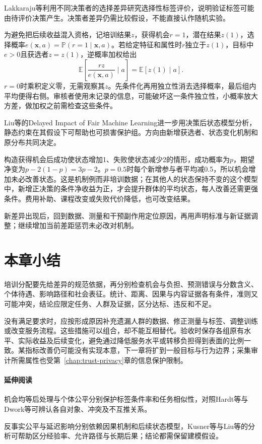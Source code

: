Lakkaraju等利用不同决策者的选择差异研究选择性标签评价，说明验证标签可能由待评价决策产生。决策者差异仍需比较假设，不能直接认作随机实验。

为避免把后续收益混入资格，记培训结果$z$，获得机会$r=1$，潜在结果$z(1)$，选择概率$e(\bm{x},a)=\mathbb P(r=1\mid\bm{x},a)$。若给定特征和属性时$r$独立于$z(1)$，目标中$e>0$且获选者$z=z(1)$，逆概率加权给出
\begin{equation}
 \mathbb E\!\left[\frac{r z}{e(\bm{x},a)}\mid a\right]
 =\mathbb E[z(1)\mid a].
 \label{eq:fairness-selective-weight}
\end{equation}
$r=0$时乘积定义零，无需观察其$z$。先条件化再用独立性消去选择概率，最后组内平均便得右侧。审核者使用未记录的信息，可能破坏这一条件独立性，小概率放大方差，做加权之前需检查这些条件。

Liu等的Delayed Impact of Fair Machine Learning进一步用决策后状态模型分析，静态约束在其假设下可帮助也可损害保护组。方向由新增获选者、状态变化机制和原分布共同决定。

构造获得机会后成功使状态增加1、失败使状态减少2的情形，成功概率为$p$，期望净变为$p-2(1-p)=3p-2$。$p=0.5$时每个新增参与者平均减0.5，所以机会增加未必改善状态。这是机制例而非培训数据；在其他人的状态保持不变的这个模型中，新增正决策的条件净收益为正，才会提升群体的平均状态，每人改善还需更强条件。费用补助、课程改变或失败代价降低，也可改变结果。

新差异出现后，回到数据、测量和干预副作用定位原因，再用声明标准与新证据调整；继续增加当前差距惩罚未必改对机制。

\section{本章小结}
\label{sec:fairness-summary}

培训分配要先给差异的规范依据，再分别检查机会与负担、预测错误与分数含义、个体待遇、影响路径和社会表征。统计、距离、因果与内容证据各有条件，准则又可能冲突，结论应限定任务、人群及证据，区分达标、违反和不足。

没有满足要求时，应按形成原因补充遗漏人群的数据、修正测量与标签、调整训练或改变服务流程。这些措施可以组合，却不能互相替代。验收时保存各组原有水平、实际收益及后续变化，避免通过降低服务水平或转移负担得到表面的比例一致。某指标改善仍可能没有实现本意，下一章将扩到一般目标与行为边界；采集审计所需属性也受第~\ref{chap:trust-privacy}章的信息保护限制。

\paragraph{延伸阅读}

机会均等后处理与个体公平分别保护标签条件率和任务相似性，对照Hardt等与Dwork等可辨认各自对象、冲突及不互推关系。

反事实公平与延迟影响分别依赖因果机制和后续状态模型，Kusner等与Liu等的分析可帮助区分经验率、允许路径与长期后果；结论都需保留建模假设。
